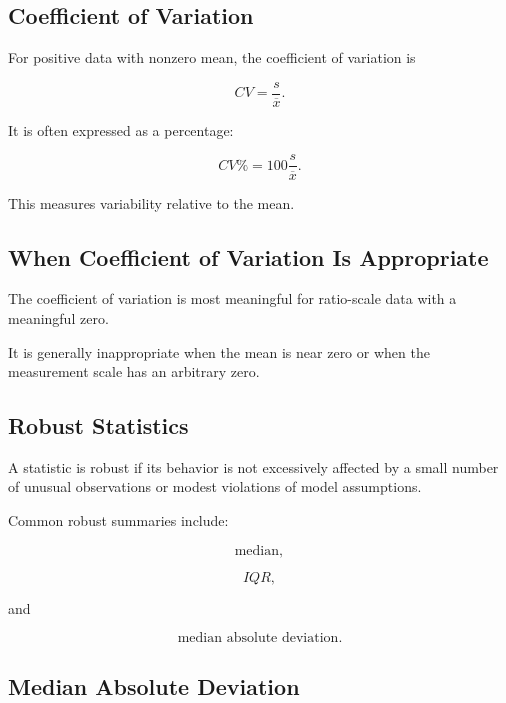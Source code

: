 \subsection{Coefficient of Variation}
\label{subsec:coefficient-variation}

For positive data with nonzero mean, the coefficient of variation is

\[
\boxed{
CV
=
\frac{s}{\overline{x}}.
}
\]

It is often expressed as a percentage:

\[
\boxed{
CV\%
=
100
\frac{s}{\overline{x}}.
}
\]

This measures variability relative to the mean.

\subsection{When Coefficient of Variation Is Appropriate}
\label{subsec:cv-appropriate}

The coefficient of variation is most meaningful for ratio-scale data
with a meaningful zero.

It is generally inappropriate when the mean is near zero or when the
measurement scale has an arbitrary zero.

\subsection{Robust Statistics}
\label{subsec:robust-statistics-intro}

A statistic is robust if its behavior is not excessively affected by a
small number of unusual observations or modest violations of model
assumptions.

Common robust summaries include:

\[
\boxed{
\text{median},
}
\]

\[
\boxed{
IQR,
}
\]

and

\[
\boxed{
\text{median absolute deviation}.
}
\]

\subsection{Median Absolute Deviation}
\label{subsec:median-absolute-deviation}

